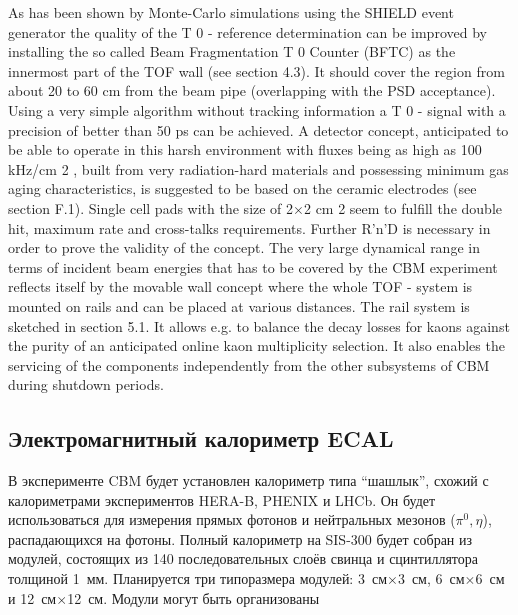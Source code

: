 As has been shown by Monte-Carlo simulations using the SHIELD event generator the quality of the T 0
- reference determination can be improved by installing the so called Beam Fragmentation T 0 Counter
(BFTC) as the innermost part of the TOF wall (see section 4.3). It should cover the region from about
20 to 60 cm from the beam pipe (overlapping with the PSD acceptance). Using a very simple algorithm
without tracking information a T 0 - signal with a precision of better than 50 ps can be achieved. A detector
concept, anticipated to be able to operate in this harsh environment with fluxes being as high as 100
kHz/cm 2 , built from very radiation-hard materials and possessing minimum gas aging characteristics, is
suggested to be based on the ceramic electrodes (see section F.1). Single cell pads with the size of 2$\times$2
cm 2 seem to fulfill the double hit, maximum rate and cross-talks requirements. Further R'n'D is necessary
in order to prove the validity of the concept.
The very large dynamical range in terms of incident beam energies that has to be covered by the CBM
experiment reflects itself by the movable wall concept where the whole TOF - system is mounted on rails
and can be placed at various distances. The rail system is sketched in section 5.1. It allows e.g. to
balance the decay losses for kaons against the purity of an anticipated online kaon multiplicity selection.
It also enables the servicing of the components independently from the other subsystems of CBM during
shutdown periods.


\subsection{Электромагнитный калориметр ECAL}\label{sec:secECAL}

В эксперименте CBM будет установлен калориметр типа ``шашлык'', схожий с калориметрами экспериментов HERA-B, PHENIX и LHCb. Он будет использоваться для измерения прямых фотонов и нейтральных мезонов ($ \pi^{0}, \eta $), распадающихся на фотоны. Полный калориметр на SIS-300 будет собран из модулей, состоящих из 140 последовательных слоёв свинца и сцинтиллятора толщиной 1~мм. Планируется три типоразмера модулей: 3~см$\times$3~см, 6~см$\times$6~см и 12~см$\times$12~см. Модули могут быть организованы

